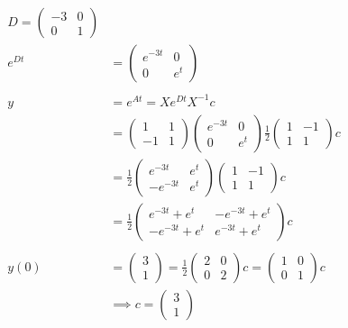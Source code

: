 \documentclass{article}
\begin{document}
\begin{align*}
    D = \begin{pmatrix} -3 & 0 \\ 0 & 1 \end{pmatrix} \\
    e^{Dt} &= \begin{pmatrix} e^{-3t} & 0 \\ 0 & e^t \end{pmatrix} \\
    \\
    y &= e^{At} = X e^{Dt} X^{-1} c \\
    &= \begin{pmatrix} 1 & 1 \\ -1 & 1 \end{pmatrix} \begin{pmatrix} e^{-3t} & 0 \\ 0 & e^t \end{pmatrix} \frac{1}{2} \begin{pmatrix} 1 & -1 \\ 1 & 1 \end{pmatrix} c \\
    &= \frac{1}{2} \begin{pmatrix} e^{-3t} & e^t \\ -e^{-3t} & e^t \end{pmatrix} \begin{pmatrix} 1 & -1 \\ 1 & 1 \end{pmatrix} c \\
    &= \frac{1}{2} \begin{pmatrix} e^{-3t} + e^t & -e^{-3t} + e^t \\ -e^{-3t} + e^t & e^{-3t} + e^t \end{pmatrix} c \\
    \\
    y(0) &= \begin{pmatrix} 3 \\ 1 \end{pmatrix} = \frac{1}{2} \begin{pmatrix} 2 & 0 \\ 0 & 2 \end{pmatrix} c
    = \begin{pmatrix} 1 & 0 \\ 0 & 1 \end{pmatrix} c \\
    &\implies c = \begin{pmatrix} 3 \\ 1 \end{pmatrix} \\

\end{align*}
\end{document}
